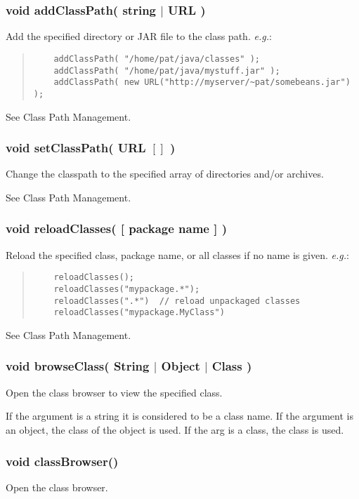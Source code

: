 \documentclass[twoside,11pt]{article}
\renewcommand{\_}{\texttt{\symbol{95}}}
\newcommand{\eg}{\textit{e.g.}}
\begin{document}
\subsubsection*{void addClassPath( string $|$ URL )}
Add the specified directory or JAR file to the class path. \eg:
\begin{quote}
\begin{verbatim}
    addClassPath( "/home/pat/java/classes" );
    addClassPath( "/home/pat/java/mystuff.jar" );
    addClassPath( new URL("http://myserver/~pat/somebeans.jar") );
\end{verbatim}
\end{quote}
See Class Path Management.

\subsubsection*{void setClassPath( URL $[]$ )}
Change the classpath to the specified array of directories and/or archives.

See Class Path Management.

\subsubsection*{void reloadClasses( [ package name ] )}
Reload the specified class, package name, or all classes if no name is
given. \eg:
\begin{quote}
\begin{verbatim}
    reloadClasses();
    reloadClasses("mypackage.*");
    reloadClasses(".*")  // reload unpackaged classes
    reloadClasses("mypackage.MyClass")
\end{verbatim}
\end{quote}

See Class Path Management.

\subsubsection*{void browseClass( String $|$ Object $|$ Class )}
Open the class browser to view the specified class.

If the argument is a string it is considered to be a class name.  
If the argument is an object, the class of the object is used.  
If the arg is a class, the class is used.

\subsubsection*{void classBrowser()}
Open the class browser.
\end{document}
